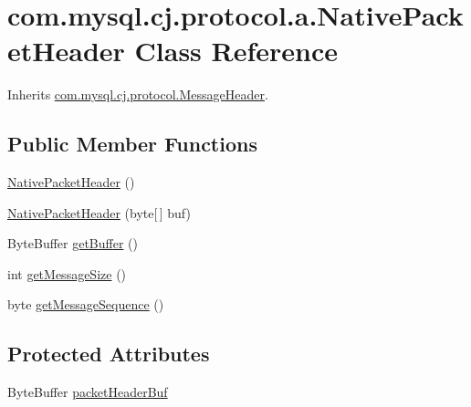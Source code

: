 \hypertarget{classcom_1_1mysql_1_1cj_1_1protocol_1_1a_1_1_native_packet_header}{}\section{com.\+mysql.\+cj.\+protocol.\+a.\+Native\+Packet\+Header Class Reference}
\label{classcom_1_1mysql_1_1cj_1_1protocol_1_1a_1_1_native_packet_header}


Inherits \mbox{\hyperlink{interfacecom_1_1mysql_1_1cj_1_1protocol_1_1_message_header}{com.\+mysql.\+cj.\+protocol.\+Message\+Header}}.

\subsection*{Public Member Functions}
\begin{DoxyCompactItemize}
\item 
\mbox{\hyperlink{classcom_1_1mysql_1_1cj_1_1protocol_1_1a_1_1_native_packet_header_aa058ef3509b0c0724645265ea4f52099}{Native\+Packet\+Header}} ()
\item 
\mbox{\hyperlink{classcom_1_1mysql_1_1cj_1_1protocol_1_1a_1_1_native_packet_header_a835faea36a24b4d257415f21bfac6e1c}{Native\+Packet\+Header}} (byte\mbox{[}$\,$\mbox{]} buf)
\item 
Byte\+Buffer \mbox{\hyperlink{classcom_1_1mysql_1_1cj_1_1protocol_1_1a_1_1_native_packet_header_a4a2e68d77caa301eab35d33743c8a9ae}{get\+Buffer}} ()
\item 
int \mbox{\hyperlink{classcom_1_1mysql_1_1cj_1_1protocol_1_1a_1_1_native_packet_header_a334336fd736a087bae40bfbb288e27e4}{get\+Message\+Size}} ()
\item 
byte \mbox{\hyperlink{classcom_1_1mysql_1_1cj_1_1protocol_1_1a_1_1_native_packet_header_aa711f4d714447b1e2cd4901af7f4d824}{get\+Message\+Sequence}} ()
\end{DoxyCompactItemize}
\subsection*{Protected Attributes}
\begin{DoxyCompactItemize}
\item 
Byte\+Buffer \mbox{\hyperlink{classcom_1_1mysql_1_1cj_1_1protocol_1_1a_1_1_native_packet_header_acc38ab1e40bb3c988932ceb4165b114c}{packet\+Header\+Buf}}
\end{DoxyCompactItemize}


